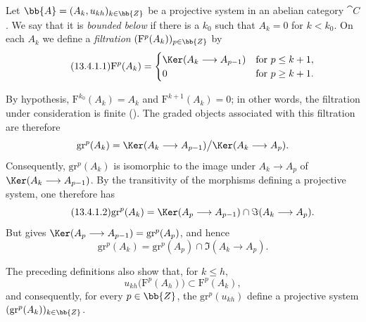 \begin{env}[13.4.1]
\label{0.13.4.1}
Let
$\bb{A}=(A_k,u_{kh})_{k\in\bb{Z}}$ be a projective system in an
abelian category $\cat{C}$.
We say that it is \emph{bounded below} if there is a $k_0$ such that
$A_k=0$ for $k<k_0$.
On each $A_k$ we define a \emph{filtration}
$(\mathrm{F}^p(A_k))_{p\in\bb{Z}}$ by
\begin{equation}
\label{0.13.4.1.1}
\tag{13.4.1.1}
  \mathrm{F}^p(A_k)=
  \begin{cases}
    \Ker(A_k\longrightarrow A_{p-1}) & \text{for }p\leq k+1,\\
    0 & \text{for }p\geq k+1.
  \end{cases}
\end{equation}

By hypothesis,
$\mathrm{F}^{k_0}(A_k)=A_k$ and
$\mathrm{F}^{k+1}(A_k)=0$; in other words, the filtration under
consideration is finite ().
The graded objects associated with this filtration are therefore
\[
  \mathrm{gr}^p(A_k)
  =
  \Ker(A_k\longrightarrow A_{p-1})
  \big/
  \Ker(A_k\longrightarrow A_p).
\]
Consequently, $\mathrm{gr}^p(A_k)$ is isomorphic to the image under
$A_k\longrightarrow A_p$ of
$\Ker(A_k\longrightarrow A_{p-1})$.
By the transitivity of the morphisms defining a projective system,
one therefore has
\begin{equation}
\label{0.13.4.1.2}
\tag{13.4.1.2}
  \mathrm{gr}^p(A_k)
  =
  \Ker(A_p\longrightarrow A_{p-1})
  \cap
  \Im(A_k\longrightarrow A_p).
\end{equation}
But  gives
$\Ker(A_p\longrightarrow A_{p-1})=\mathrm{gr}^p(A_p)$, and hence
\begin{equation}
\label{0.13.4.1.3}
\tag{13.4.1.3}
  \mathrm{gr}^p(A_k)
  =
  \mathrm{gr}^p(A_p)
  \cap
  \Im(A_k\longrightarrow A_p).
\end{equation}

The preceding definitions also show that, for $k\leq h$,
\[
  u_{kh}\bigl(\mathrm{F}^p(A_h)\bigr)
  \subset
  \mathrm{F}^p(A_k),
\]
and consequently, for every $p\in\bb{Z}$, the
$\mathrm{gr}^p(u_{kh})$ define a projective system
$(\mathrm{gr}^p(A_k))_{k\in\bb{Z}}$.
\end{env}

